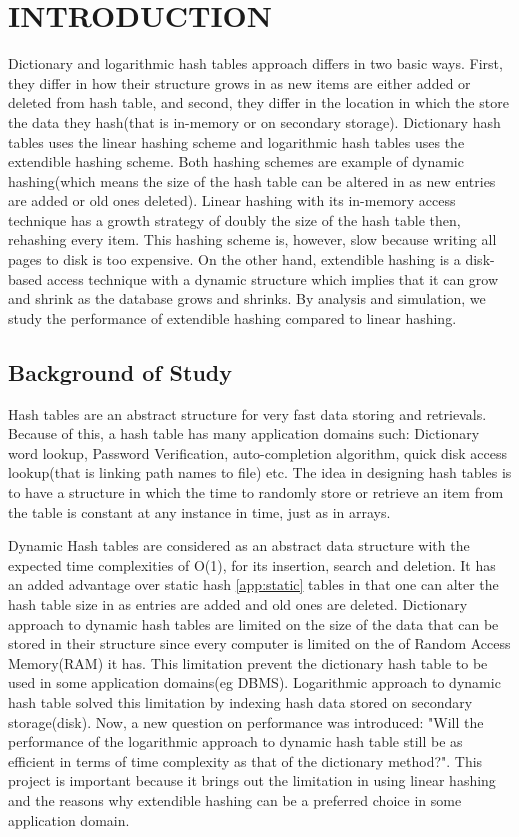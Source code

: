 \documentclass[a4paper,12pt, openany]{book}
\begin{document}
\chapter{INTRODUCTION}
Dictionary and logarithmic hash tables approach differs in two basic ways. First, they differ in how their structure grows in as new items are either added or deleted from hash table, and second, they differ in the location in which the store the data they hash(that is in-memory or on secondary storage). Dictionary hash tables uses the linear hashing scheme and logarithmic hash tables uses the extendible hashing scheme. Both hashing schemes are example of dynamic hashing(which means the size of the hash table can be altered in as new entries are added or old ones deleted). Linear hashing with its in-memory access technique has a growth strategy of doubly the size of the hash table then, rehashing every item. This hashing scheme is, however, slow because writing all pages to disk is too expensive. On the other hand, extendible hashing is a disk-based access technique with a dynamic structure which implies that it can grow and shrink as the database grows
and shrinks. By analysis and simulation, we study the performance of extendible hashing compared to linear hashing. 

\section{Background of Study}
Hash tables are an abstract structure for very fast data storing and retrievals. Because of this, a hash table has many application domains such: Dictionary word lookup, Password Verification, auto-completion algorithm, quick disk access lookup(that is linking path names to file) etc. The idea in designing hash tables is to have a structure in which the time to randomly store or retrieve an item from the table is constant at any instance in time, just as in arrays.


Dynamic Hash tables are considered as an abstract data structure with the expected time complexities of O(1), for its insertion, search and deletion. It has an added advantage over static hash \ref{app:static} tables in that one can alter the hash table size in as entries are added and old ones are deleted. Dictionary approach to dynamic hash tables are limited on the size of the data that can be stored in their structure since every computer is limited on the of Random Access Memory(RAM) it has. This limitation prevent the dictionary hash table to be used in some application domains(eg DBMS). Logarithmic approach to dynamic hash table solved this limitation by indexing hash data stored on secondary storage(disk). Now, a new question on performance was introduced: "Will the performance of the logarithmic approach to dynamic hash table still be as efficient in terms of time complexity as that of the dictionary method?". This project is important because it brings out the limitation in using linear hashing and the reasons why extendible hashing can be a preferred choice in some application domain. 
\end{document}

